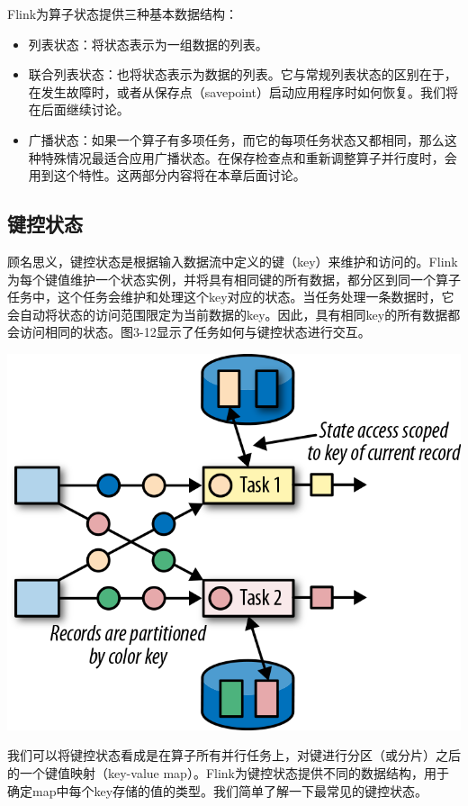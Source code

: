 \documentclass[cn,11pt,chinese]{elegantbook}
\providecommand{\tightlist}{%
  \setlength{\itemsep}{0pt}\setlength{\parskip}{0pt}}
\begin{document}
Flink为算子状态提供三种基本数据结构：

\begin{itemize}
\tightlist
\item
  列表状态：将状态表示为一组数据的列表。
\item
  联合列表状态：也将状态表示为数据的列表。它与常规列表状态的区别在于，在发生故障时，或者从保存点（savepoint）启动应用程序时如何恢复。我们将在后面继续讨论。
\item
  广播状态：如果一个算子有多项任务，而它的每项任务状态又都相同，那么这种特殊情况最适合应用广播状态。在保存检查点和重新调整算子并行度时，会用到这个特性。这两部分内容将在本章后面讨论。
\end{itemize}

\hypertarget{ux952eux63a7ux72b6ux6001}{%
\subsection{键控状态}\label{ux952eux63a7ux72b6ux6001}}

顾名思义，键控状态是根据输入数据流中定义的键（key）来维护和访问的。Flink为每个键值维护一个状态实例，并将具有相同键的所有数据，都分区到同一个算子任务中，这个任务会维护和处理这个key对应的状态。当任务处理一条数据时，它会自动将状态的访问范围限定为当前数据的key。因此，具有相同key的所有数据都会访问相同的状态。图3-12显示了任务如何与键控状态进行交互。

\includegraphics{images/spaf_0312.png}

我们可以将键控状态看成是在算子所有并行任务上，对键进行分区（或分片）之后的一个键值映射（key-value
map）。Flink为键控状态提供不同的数据结构，用于确定map中每个key存储的值的类型。我们简单了解一下最常见的键控状态。
\end{document}
